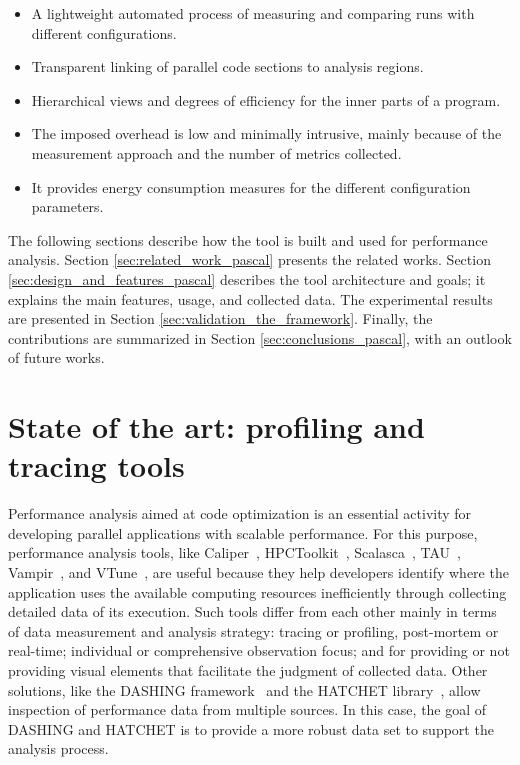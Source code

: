 \begin{itemize}
	\item A lightweight automated process of measuring and comparing runs with different configurations.
	\item Transparent linking of parallel code sections to analysis regions.
	\item Hierarchical views and degrees of efficiency for the inner parts of a program.
	\item The imposed overhead is low and minimally intrusive, mainly because of the measurement approach and the number of metrics collected.
	\item It provides energy consumption measures for the different configuration parameters. 
\end{itemize}

The following sections describe how the tool is built and used for performance analysis. Section \ref{sec:related_work_pascal} presents the related works. Section \ref{sec:design_and_features_pascal} describes the tool architecture and goals; it explains the main features, usage, and collected data. The experimental results are presented in Section \ref{sec:validation_the_framework}. Finally, the contributions are summarized in Section \ref{sec:conclusions_pascal}, with an outlook of future works.

\section{State of the art: profiling and tracing tools} \label{sec:state_of_the_art_profiling_and_tracing_tools}

Performance analysis aimed at code optimization is an essential activity for developing parallel applications with scalable performance. For this purpose, performance analysis tools, like Caliper~\cite{Boehme2016}, HPCToolkit~\cite{Adhianto2010}, Scalasca~\cite{Geimer2010}, TAU~\cite{Shende2006}, Vampir~\cite{Weber2019}, and VTune~\cite{VTune}, are useful because they help developers identify where the application uses the available computing resources inefficiently through collecting detailed data of its execution. Such tools differ from each other mainly in terms of data measurement and analysis strategy: tracing or profiling, post-mortem or real-time; individual or comprehensive observation focus; and for providing or not providing visual elements that facilitate the judgment of collected data. Other solutions, like the DASHING framework~\cite{Islam2019} and the HATCHET library~\cite{Brink2020}, allow inspection of performance data from multiple sources. In this case, the goal of DASHING and HATCHET is to provide a more robust data set to support the analysis process.


